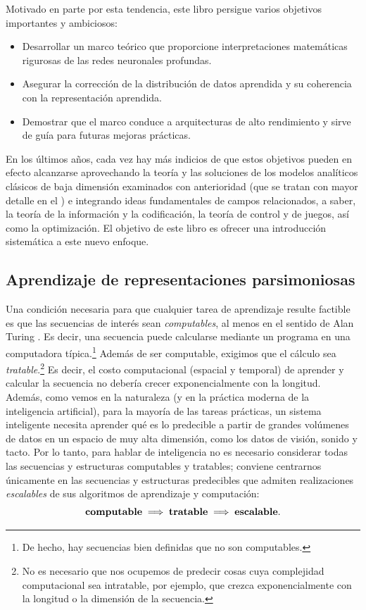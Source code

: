 \documentclass[../../book-main_es.tex]{subfiles}
\begin{document}
Motivado en parte por esta tendencia, este libro persigue varios objetivos importantes
y ambiciosos:
\begin{itemize}
    \item Desarrollar un marco teórico que proporcione interpretaciones matemáticas rigurosas
        de las redes neuronales profundas.
    \item Asegurar la corrección de la distribución de datos aprendida y
        su coherencia con la representación aprendida.
    \item Demostrar que el marco conduce a arquitecturas de alto rendimiento
        y sirve de guía para futuras mejoras prácticas.
\end{itemize}
En los últimos años, cada vez hay más indicios de que estos objetivos pueden en efecto alcanzarse
aprovechando la teoría y las soluciones de los modelos analíticos clásicos
de baja dimensión examinados con anterioridad (que se tratan con mayor
detalle en el ) e integrando ideas fundamentales
de campos relacionados, a saber, la teoría de la información y la codificación, 
la teoría de control y de juegos, así como la optimización. El objetivo de este 
libro es ofrecer una introducción sistemática a este nuevo enfoque.

\subsection{Aprendizaje de representaciones parsimoniosas}
\label{sec:computational-approach-compression}
Una condición necesaria para que cualquier tarea de aprendizaje resulte factible es que
las secuencias de interés sean \textit{computables}, al menos en el
sentido de Alan Turing \cite{Turing-1936}. Es decir, una secuencia puede
calcularse mediante un programa en una computadora típica.\footnote{De hecho,
hay secuencias bien definidas que no son computables.} Además
de ser computable, exigimos que el cálculo sea
\textit{tratable}.\footnote{No es necesario que nos ocupemos de predecir
    cosas cuya complejidad computacional sea intratable, por ejemplo, que crezca
exponencialmente con la longitud o la dimensión de la secuencia.} Es decir,
el costo computacional (espacial y temporal) de aprender y calcular
la secuencia no debería crecer exponencialmente con la longitud. Además, como
vemos en la naturaleza (y en la práctica moderna de la inteligencia
artificial), para la mayoría de las tareas prácticas, un sistema inteligente necesita
aprender qué es lo predecible a partir de grandes volúmenes de datos en un espacio de
muy alta dimensión, como los datos de visión, sonido y tacto. Por lo tanto,
para hablar de inteligencia no es necesario considerar todas las secuencias y
estructuras computables y tratables; conviene centrarnos únicamente en
las secuencias y estructuras predecibles que admiten realizaciones \textit{escalables}
de sus algoritmos de aprendizaje y computación:
\begin{equation}
    \text{\textbf{computable}} \;
    \Longrightarrow \; \text{\textbf{tratable}} \; \Longrightarrow \;
    \text{\textbf{escalable}}.
\end{equation}
\end{document}

